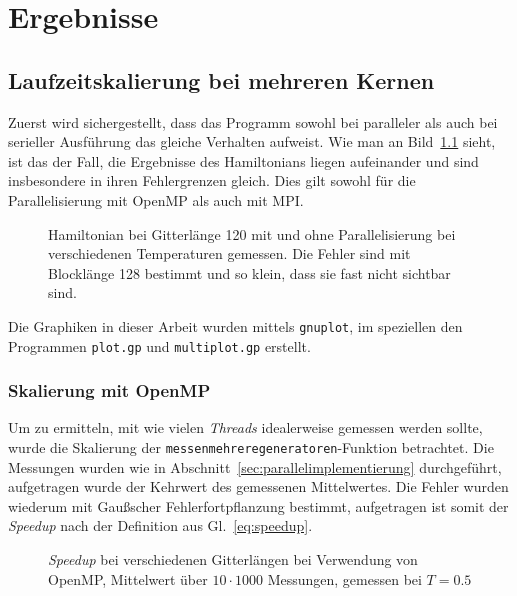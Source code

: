 	\chapter{Ergebnisse}
	\label{chap:ergebnisse}
	
	
	\section{Laufzeitskalierung bei mehreren Kernen}
	\label{sec:ergebnisparallel}
	Zuerst wird sichergestellt, dass das Programm sowohl bei paralleler als auch bei serieller Ausführung das gleiche Verhalten aufweist. Wie man an Bild~\ref{fig:vergleichham} sieht, ist das der Fall, die Ergebnisse des Hamiltonians liegen aufeinander und sind insbesondere in ihren Fehlergrenzen gleich. Dies gilt sowohl für die Parallelisierung mit OpenMP als auch mit MPI.
	
	\begin{figure}[htbp]
		
		\caption[Hamiltonian mit und ohne Parallelisierung]{Hamiltonian bei Gitterlänge 120 mit und ohne Parallelisierung bei verschiedenen Temperaturen gemessen. Die Fehler sind mit Blocklänge 128 bestimmt und so klein, dass sie fast nicht sichtbar sind.}
		\label{fig:vergleichham}
	\end{figure}
	
	Die Graphiken in dieser Arbeit wurden mittels \texttt{gnuplot}\cite{gnuplotdoc}, im speziellen den Programmen \texttt{plot.gp} und \texttt{multiplot.gp} erstellt.
	
	\subsection{Skalierung mit OpenMP}
	
	Um zu ermitteln, mit wie vielen \textit{Threads} idealerweise gemessen werden sollte, wurde die Skalierung der \texttt{messenmehreregeneratoren}-Funktion betrachtet. Die Messungen wurden wie in Abschnitt~\ref{sec:parallelimplementierung} durchgeführt, aufgetragen wurde der Kehrwert des gemessenen Mittelwertes. Die Fehler wurden wiederum mit Gaußscher Fehlerfortpflanzung bestimmt, aufgetragen ist somit der \textit{Speedup} nach der Definition aus Gl.~\ref{eq:speedup}.%
	
	\begin{figure}[htbp]
		
		\caption[\textit{Speedup} bei verschiedenen Gitterlängen bei Verwendung von OpenMP]{\textit{Speedup}  bei verschiedenen Gitterlängen bei Verwendung von OpenMP, Mittelwert über $10 \cdot 1000$ Messungen, gemessen bei $T=\num{0,5}$}
		\label{fig:skalierunglaenge}
	\end{figure}
	

